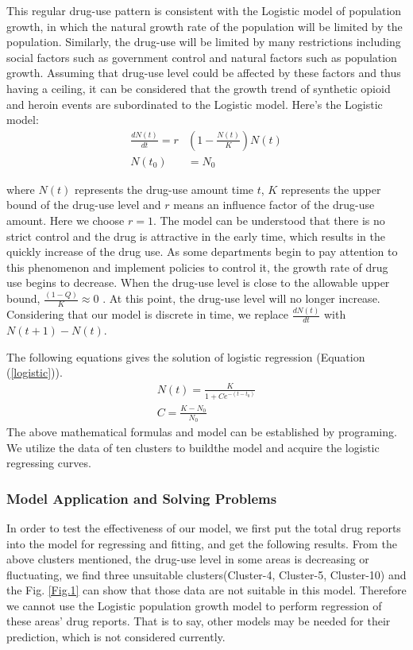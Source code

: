 \documentclass[11pt]{article}
\begin{document}
This regular drug-use pattern is consistent with the Logistic model of population growth, in which the natural growth rate of the population will be limited by the population. Similarly, the drug-use will be limited by many restrictions including social factors such as government control and natural factors such as population growth. Assuming that drug-use level could be affected by these factors and thus having a ceiling, it can be considered that the growth trend of synthetic opioid and heroin events are subordinated to the Logistic model. Here’s the Logistic model:
\begin{equation}
	\begin{split}
	\frac{dN(t)}{dt} = r&(1-\frac{N(t)}{K})N(t) \label{logistic}\\
	N(t_{0}) &= N_{0}
	\end{split}
\end{equation}

where $N(t)$ represents the drug-use amount time $t$, $K$ represents the upper bound of the drug-use level and $r$ means an influence factor of the drug-use amount. Here we choose $r=1$. The model can be understood that there is no strict control and the drug is attractive in the early time, which results in the quickly increase of the drug use. As some departments begin to pay attention to this phenomenon and implement policies to control it, the growth rate of drug use begins to decrease. When the drug-use level is close to the allowable upper bound, $\frac{(1-Q)}{K} \approx 0$ . At this point, the drug-use level will no longer increase. Considering that our model is discrete in time,  we replace $\frac{dN(t)}{dt}$ with $N(t+1)-N(t)$.

The following equations gives the solution of logistic regression (Equation (\ref{logistic})).
\begin{gather}
	N(t)=\frac{K}{1+Ce^{-(t-t_{0})}} \\
	C=\frac{K-N_{0}}{N_{0}} 
\end{gather}
The above mathematical formulas and model can be established by programing. We utilize the data of ten clusters to buildthe model and acquire the logistic regressing curves.

\subsubsection{Model Application and Solving Problems}
In order to test the effectiveness of our model, we first put the total drug reports into the model for regressing and fitting, and get the following results. From the above clusters mentioned, the drug-use level in some areas is decreasing or fluctuating, we find three unsuitable clusters(Cluster-4, Cluster-5, Cluster-10) and the Fig. \ref{Fig.1} can show that those data are not suitable in this model. Therefore we cannot use the Logistic population growth model to perform regression of these areas’ drug reports. That is to say, other models may be needed for their prediction, which is not considered currently.
\end{document}

